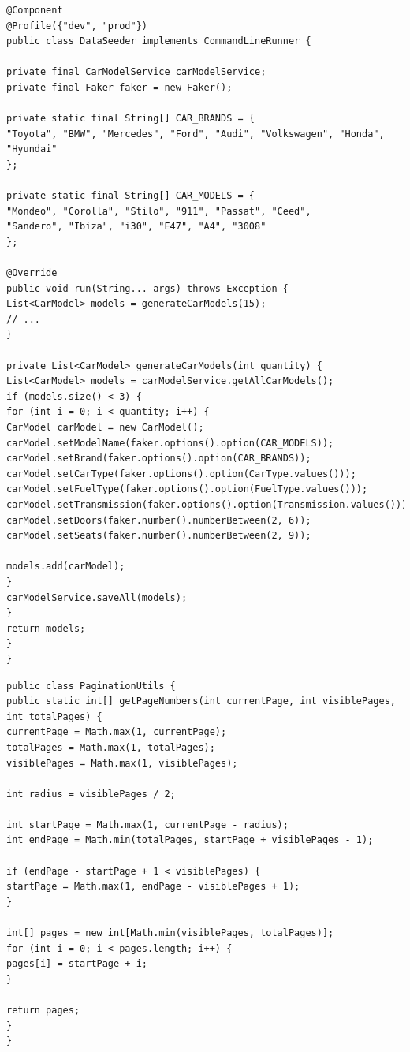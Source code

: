 \documentclass[12pt]{article}
\begin{document}
\begin{lstlisting}[style=customjava, caption={Fragment klasy DataSeeder – generowanie modeli samochodów}]
@Component
@Profile({"dev", "prod"})
public class DataSeeder implements CommandLineRunner {

private final CarModelService carModelService;
private final Faker faker = new Faker();

private static final String[] CAR_BRANDS = {
"Toyota", "BMW", "Mercedes", "Ford", "Audi", "Volkswagen", "Honda", "Hyundai"
};

private static final String[] CAR_MODELS = {
"Mondeo", "Corolla", "Stilo", "911", "Passat", "Ceed", 
"Sandero", "Ibiza", "i30", "E47", "A4", "3008"
};

@Override
public void run(String... args) throws Exception {
List<CarModel> models = generateCarModels(15);
// ...
}

private List<CarModel> generateCarModels(int quantity) {
List<CarModel> models = carModelService.getAllCarModels();
if (models.size() < 3) {
for (int i = 0; i < quantity; i++) {
CarModel carModel = new CarModel();
carModel.setModelName(faker.options().option(CAR_MODELS));
carModel.setBrand(faker.options().option(CAR_BRANDS));
carModel.setCarType(faker.options().option(CarType.values()));
carModel.setFuelType(faker.options().option(FuelType.values()));
carModel.setTransmission(faker.options().option(Transmission.values()));
carModel.setDoors(faker.number().numberBetween(2, 6));
carModel.setSeats(faker.number().numberBetween(2, 9));

models.add(carModel);
}
carModelService.saveAll(models);
}
return models;
}
}
\end{lstlisting}
	\newpage
\begin{lstlisting}[style=customJava, caption={Klasa PaginationUtils - oblicza numery stron do wyświetlenia w paginacji}]
public class PaginationUtils {
public static int[] getPageNumbers(int currentPage, int visiblePages, int totalPages) {
currentPage = Math.max(1, currentPage);
totalPages = Math.max(1, totalPages);
visiblePages = Math.max(1, visiblePages);

int radius = visiblePages / 2;

int startPage = Math.max(1, currentPage - radius);
int endPage = Math.min(totalPages, startPage + visiblePages - 1);

if (endPage - startPage + 1 < visiblePages) {
startPage = Math.max(1, endPage - visiblePages + 1);
}

int[] pages = new int[Math.min(visiblePages, totalPages)];
for (int i = 0; i < pages.length; i++) {
pages[i] = startPage + i;
}

return pages;
}
}
\end{lstlisting}
\end{document}
